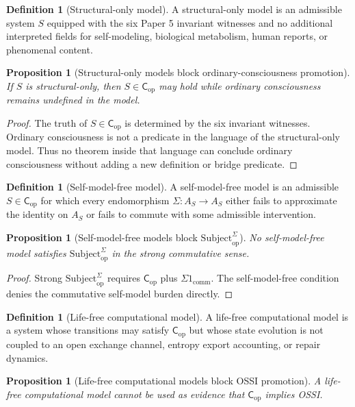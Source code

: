 \documentclass[11pt,a4paper]{article}
\newtheorem{proposition}[theorem]{Proposition}
\theoremstyle{definition}
\newtheorem{definition}[theorem]{Definition}
\newcommand{\Cop}{\mathsf{C}_{\mathrm{op}}}
\newcommand{\Subbridge}{\mathrm{Subject}^{\Sigma}_{\mathrm{op}}}
\newcommand{\Aset}{A_S}
\begin{document}
\begin{definition}[Structural-only model]
A structural-only model is an admissible system $S$ equipped with the six
Paper 5 invariant witnesses and no additional interpreted fields for
self-modeling, biological metabolism, human reports, or phenomenal content.
\end{definition}

\begin{proposition}[Structural-only models block ordinary-consciousness promotion]
If $S$ is structural-only, then $S\in\Cop$ may hold while ordinary
consciousness remains undefined in the model.
\end{proposition}

\begin{proof}
The truth of $S\in\Cop$ is determined by the six invariant witnesses. Ordinary
consciousness is not a predicate in the language of the structural-only model.
Thus no theorem inside that language can conclude ordinary consciousness
without adding a new definition or bridge predicate.
\end{proof}

\begin{definition}[Self-model-free model]
A self-model-free model is an admissible $S\in\Cop$ for which every endomorphism
$\Sigma:\Aset\to\Aset$ either fails to approximate the identity on $\Aset$ or
fails to commute with some admissible intervention.
\end{definition}

\begin{proposition}[Self-model-free models block $\Subbridge$]
No self-model-free model satisfies $\Subbridge$ in the strong commutative
sense.
\end{proposition}

\begin{proof}
Strong $\Subbridge$ requires $\Cop$ plus $\Sigma1_{\mathrm{comm}}$. The
self-model-free condition denies the commutative self-model burden directly.
\end{proof}

\begin{definition}[Life-free computational model]
A life-free computational model is a system whose transitions may satisfy
$\Cop$ but whose state evolution is not coupled to an open exchange channel,
entropy export accounting, or repair dynamics.
\end{definition}

\begin{proposition}[Life-free computational models block OSSI promotion]
A life-free computational model cannot be used as evidence that $\Cop$ implies
OSSI.
\end{proposition}
\end{document}
